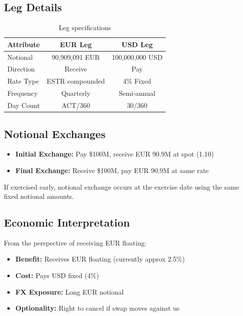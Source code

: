 \documentclass[10pt,a4paper]{article}
\begin{document}
\subsection{Leg Details}

\begin{table}[H]
\centering
\begin{tabular}{lcc}
\toprule
\textbf{Attribute} & \textbf{EUR Leg} & \textbf{USD Leg} \\
\midrule
Notional & 90,909,091 EUR & 100,000,000 USD \\
Direction & Receive & Pay \\
Rate Type & ESTR compounded & 4\% Fixed \\
Frequency & Quarterly & Semi-annual \\
Day Count & ACT/360 & 30/360 \\
\bottomrule
\end{tabular}
\caption{Leg specifications}
\end{table}

\subsection{Notional Exchanges}

\begin{itemize}
    \item \textbf{Initial Exchange:} Pay \$100M, receive EUR 90.9M at spot (1.10)
    \item \textbf{Final Exchange:} Receive \$100M, pay EUR 90.9M at same rate
\end{itemize}

If exercised early, notional exchange occurs at the exercise date using the same fixed notional amounts.

\subsection{Economic Interpretation}

From the perspective of receiving EUR floating:
\begin{itemize}
    \item \textbf{Benefit:} Receives EUR floating (currently approx 2.5\%)
    \item \textbf{Cost:} Pays USD fixed (4\%)
    \item \textbf{FX Exposure:} Long EUR notional
    \item \textbf{Optionality:} Right to cancel if swap moves against us
\end{itemize}
\end{document}
